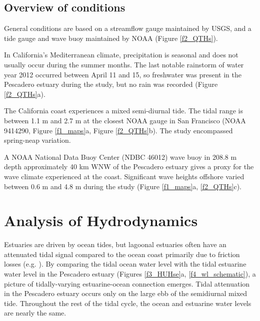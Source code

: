 \subsection{Overview of conditions\label{sub:ext_cond}}

General conditions are based on a streamflow gauge maintained by USGS,
and a tide gauge and wave buoy maintained by NOAA (Figure \ref{f2_QTHs}). 

In California's Mediterranean climate, precipitation is seasonal and
does not usually occur during the summer months. The last notable
rainstorm of water year 2012 occurred between April 11 and 15, so
freshwater was present in the Pescadero estuary during the study,
but no rain was recorded (Figure \ref{f2_QTHs}a). 

The California coast experiences a mixed semi-diurnal tide. The tidal
range is between 1.1 m and 2.7 m at the closest NOAA gauge in San
Francisco (NOAA 9414290, Figure \ref{f1_maps}a, Figure \ref{f2_QTHs}b).
The study encompassed spring-neap variation.

A NOAA National Data Buoy Center (NDBC 46012) wave buoy in
208.8 m depth approximately 40 km WNW of the Pescadero estuary gives
a proxy for the wave climate experienced at the coast. Significant
wave heights offshore varied between 0.6 m and 4.8 m during the study
(Figure \ref{f1_maps}a, \ref{f2_QTHs}c). 





\section{Analysis of Hydrodynamics}

Estuaries are driven by ocean tides, but lagoonal estuaries often
have an attenuated tidal signal compared to the ocean coast primarily
due to friction losses (e.g. \cite{rydberg_tidal_1996}).
By comparing the tidal ocean water level with the tidal estuarine
water level in the Pescadero estuary (Figures \ref{f3_HUHse}a, \ref{f4_wl_schematic}),
a picture of tidally-varying estuarine-ocean connection emerges. Tidal
attenuation in the Pescadero estuary occurs only on the large ebb
of the semidiurnal mixed tide. Throughout the rest of the tidal cycle,
the ocean and estuarine water levels are nearly the same.

